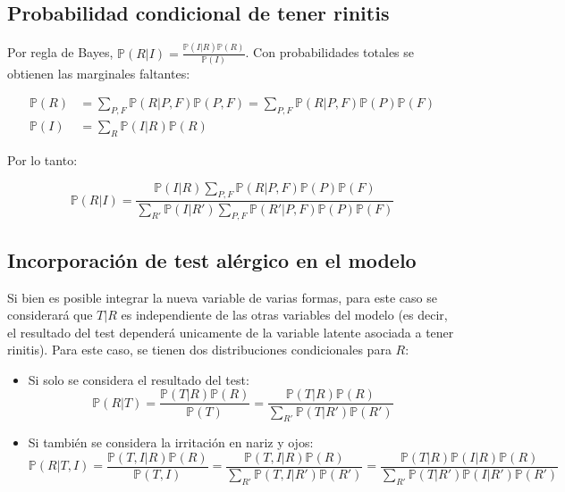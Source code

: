 \documentclass{article}
\newcommand{\prob}{\mathbb{P}}
\begin{document}
\newpage
\subsection{Probabilidad condicional de tener rinitis}

Por regla de Bayes, $\prob(R|I) = \frac{\prob(I|R)\prob(R)}{\prob(I)}$. Con probabilidades totales se obtienen las marginales faltantes:

\begin{align*}
	\prob(R) &= \sum_{P,F} \prob(R|P,F)\prob(P,F) = \sum_{P,F} \prob(R|P,F)\prob(P)\prob(F)\\
	\prob(I) &= \sum_{R} \prob(I|R)\prob(R)
\end{align*}

Por lo tanto:

\begin{equation*}
	\prob(R|I) = \frac{\prob(I|R)\sum_{P,F} \prob(R|P,F)\prob(P)\prob(F)}{\sum_{R'} \prob(I|R') \sum_{P,F} \prob(R'|P,F)\prob(P)\prob(F)}
\end{equation*}

\subsection{Incorporación de test alérgico en el modelo}

Si bien es posible integrar la nueva variable de varias formas, para este caso se considerará que $T|R$ es independiente de las otras variables del modelo (es decir, el resultado del test dependerá unicamente de la variable latente asociada a tener rinitis). Para este caso, se tienen dos distribuciones condicionales para $R$: 

\begin{itemize}
	\item Si solo se considera el resultado del test:
	\begin{equation*}
		\prob(R|T) = \frac{\prob(T|R)\prob(R)}{\prob(T)} = \frac{\prob(T|R)\prob(R)}{\sum_{R'} \prob(T|R')\prob(R')}
	\end{equation*}

	\item Si también se considera la irritación en nariz y ojos:
	\begin{equation*}
		\prob(R|T,I) = \frac{\prob(T,I|R)\prob(R)}{\prob(T,I)} = \frac{\prob(T,I|R)\prob(R)}{\sum_{R'} \prob(T,I|R')\prob(R')} = \frac{\prob(T|R)\prob(I|R)\prob(R)}{\sum_{R'}\prob(T|R')\prob(I|R')\prob(R')}
	\end{equation*}
\end{itemize}
\end{document}
